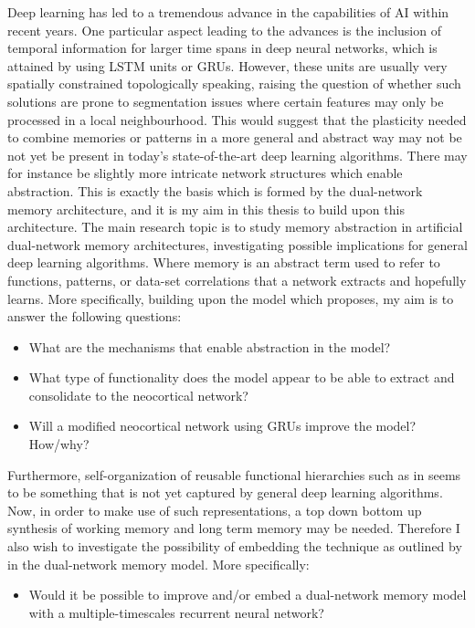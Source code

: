 Deep learning has led to a tremendous advance in the capabilities of AI within recent years. One particular aspect leading to the advances is the inclusion of temporal information for larger time spans in deep neural networks, which is attained by using LSTM units or GRUs. However, these units are usually very spatially constrained topologically speaking, raising the question of whether such solutions are prone to segmentation issues where certain features may only be processed in a local neighbourhood. This would suggest that the plasticity needed to combine memories or patterns in a more general and abstract way may not be not yet be present in today's state-of-the-art deep learning algorithms. There may for instance be slightly more intricate network structures which enable abstraction. This is exactly the basis which is formed by the dual-network memory architecture, and it is my aim in this thesis to build upon this architecture. 
The main research topic is to study memory abstraction in artificial dual-network memory architectures, investigating possible implications for general deep learning algorithms. Where memory is an abstract term used to refer to functions, patterns, or data-set correlations that a network extracts and hopefully learns. More specifically, building upon the model which \cite{Hattori2014} proposes, my aim is to answer the following questions:
\begin{itemize}
\item What are the mechanisms that enable abstraction in the model?
\item What type of functionality does the model appear to be able to extract and consolidate to the neocortical network?
\item Will a modified neocortical network using GRUs improve the model? How/why?
\end{itemize}

Furthermore, self-organization of reusable functional hierarchies such as in \citep{Tani2014} seems to be something that is not yet captured by general deep learning algorithms. Now, in order to make use of such representations, a top down bottom up synthesis of working memory and long term memory may be needed. Therefore I also wish to investigate the possibility of embedding the technique as outlined by \cite{Tani2014} in the dual-network memory model. More specifically:
\begin{itemize}
\item Would it be possible to improve and/or embed a dual-network memory model with a multiple-timescales recurrent neural network?
\end{itemize}

